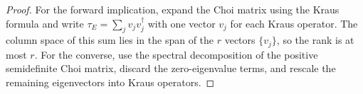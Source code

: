 \begin{proof}
    \leanok
    For the forward implication, expand the Choi matrix using the Kraus formula
    and write $\tau_E = \sum_j v_j v_j^\dagger$ with one vector $v_j$ for each
    Kraus operator. The column space of this sum lies in the span of the $r$
    vectors $\{v_j\}$, so the rank is at most $r$. For the converse, use the
    spectral decomposition of the positive semidefinite Choi matrix,
    discard the zero-eigenvalue terms, and rescale the remaining eigenvectors
    into Kraus operators.
\end{proof}


